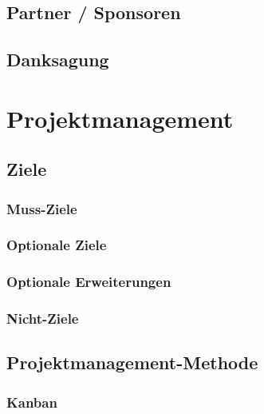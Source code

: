 \section{Partner / Sponsoren}

\section{Danksagung}

\chapter{Projektmanagement}
\renewcommand{\kapitelautor}{}

\section{Ziele}

  \subsection{Muss-Ziele}

  \subsection{Optionale Ziele}

  \subsection{Optionale Erweiterungen}

  \subsection{Nicht-Ziele}

\section{Projektmanagement-Methode}

  \subsection{Kanban}

